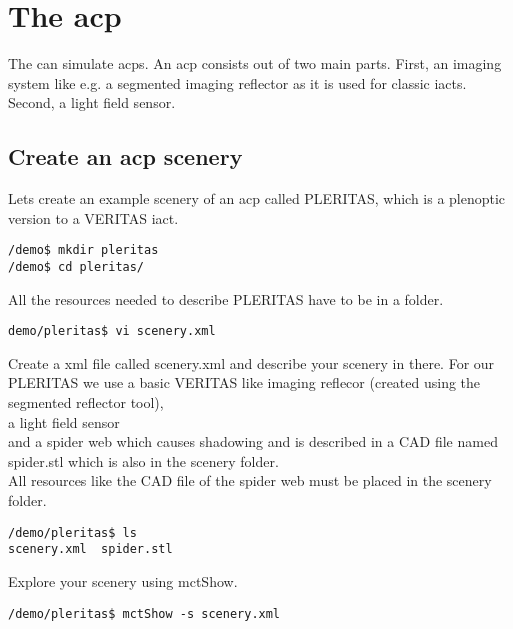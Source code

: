 \chapter{The \acf{acp}}
%
The \tool{} can simulate \acp{acp}.
%
An \ac{acp} consists out of two main parts.
%
First, an imaging system like e.g. a segmented imaging reflector as it is used for classic \acp{iact}.
%
Second, a light field sensor.
%
\section{Create an \ac{acp} scenery}
%
Lets create an example scenery of an \ac{acp} called PLERITAS, which is a plenoptic version to a VERITAS \ac{iact}.
%
\begin{lstlisting}[style=MctBash]
/demo$ mkdir pleritas
/demo$ cd pleritas/
\end{lstlisting}
All the resources needed to describe PLERITAS have to be in a folder.
%
\begin{lstlisting}[style=MctBash]
demo/pleritas$ vi scenery.xml
\end{lstlisting}
%
Create a xml file called scenery.xml and describe your scenery in there.
%
For our PLERITAS we use a basic VERITAS like imaging reflecor (created using the segmented reflector tool),\\
%
%
a light field sensor\\
%
%
and a spider web which causes shadowing and is described in a CAD file named spider.stl which is also in the scenery folder.\\
%
%
\newline
{}
%
%
All resources like the CAD file of the spider web must be placed in the scenery folder.
%
\begin{lstlisting}[style=MctBash]
/demo/pleritas$ ls
scenery.xml  spider.stl
\end{lstlisting}
%
Explore your scenery using mctShow.
%
\begin{lstlisting}[style=MctBash]
/demo/pleritas$ mctShow -s scenery.xml
\end{lstlisting}
%
